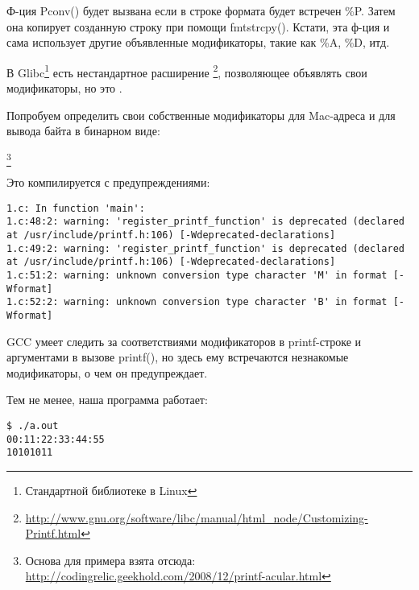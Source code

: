 Ф-ция Pconv() будет вызвана если в строке формата будет встречен \%P. Затем она копирует созданную строку
при помощи fmtstrcpy(). Кстати, эта ф-ция и сама использует другие объявленные модификаторы, такие как \%A, \%D, итд.

В Glibc\footnote{Стандартной библиотеке в Linux} есть нестандартное расширение
\footnote{\url{http://www.gnu.org/software/libc/manual/html_node/Customizing-Printf.html}}, 
позволяющее объявлять свои модификаторы, но это .

Попробуем определить свои собственные модификаторы для Mac-адреса и для вывода байта в бинарном виде:


\footnote{Основа для примера взята отсюда: \url{http://codingrelic.geekhold.com/2008/12/printf-acular.html}}

Это компилируется с предупреждениями:

\begin{lstlisting}
1.c: In function 'main':
1.c:48:2: warning: 'register_printf_function' is deprecated (declared at /usr/include/printf.h:106) [-Wdeprecated-declarations]
1.c:49:2: warning: 'register_printf_function' is deprecated (declared at /usr/include/printf.h:106) [-Wdeprecated-declarations]
1.c:51:2: warning: unknown conversion type character 'M' in format [-Wformat]
1.c:52:2: warning: unknown conversion type character 'B' in format [-Wformat]
\end{lstlisting}

GCC умеет следить за соответствиями модификаторов в printf-строке и аргументами в вызове printf(), но здесь
ему встречаются незнакомые модификаторы, о чем он предупреждает.

Тем не менее, наша программа работает:

\begin{lstlisting}
$ ./a.out
00:11:22:33:44:55
10101011
\end{lstlisting}

